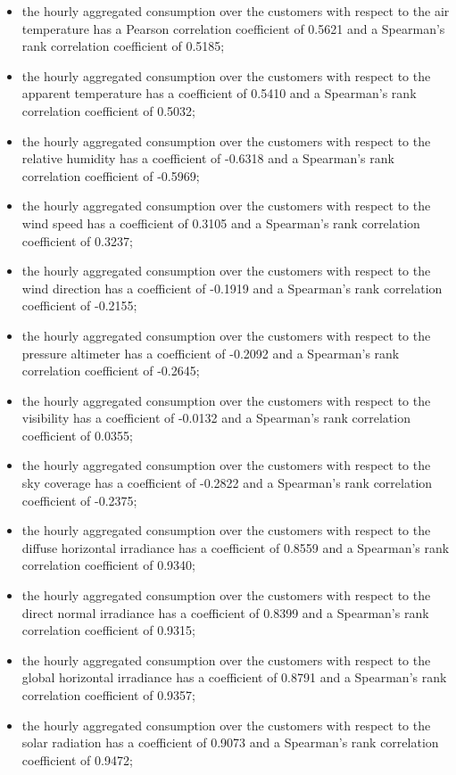 \begin{itemize}
  \item the hourly aggregated consumption over the customers with respect to the air temperature has a Pearson correlation coefficient of 0.5621 and a Spearman's rank correlation coefficient of 0.5185;
  \item the hourly aggregated consumption over the customers with respect to the apparent temperature has a coefficient of 0.5410 and a Spearman's rank correlation coefficient of 0.5032;
  \item the hourly aggregated consumption over the customers with respect to the relative humidity has a coefficient of -0.6318 and a Spearman's rank correlation coefficient of -0.5969;
  \item the hourly aggregated consumption over the customers with respect to the wind speed has a coefficient of 0.3105 and a Spearman's rank correlation coefficient of 0.3237;
  \item the hourly aggregated consumption over the customers with respect to the wind direction has a coefficient of -0.1919 and a Spearman's rank correlation coefficient of -0.2155;
  \item the hourly aggregated consumption over the customers with respect to the pressure altimeter has a coefficient of -0.2092 and a Spearman's rank correlation coefficient of -0.2645;
  \item the hourly aggregated consumption over the customers with respect to the visibility has a coefficient of -0.0132 and a Spearman's rank correlation coefficient of 0.0355;
  \item the hourly aggregated consumption over the customers with respect to the sky coverage has a coefficient of -0.2822 and a Spearman's rank correlation coefficient of -0.2375;
  \item the hourly aggregated consumption over the customers with respect to the diffuse horizontal irradiance has a coefficient of 0.8559 and a Spearman's rank correlation coefficient of 0.9340;
  \item the hourly aggregated consumption over the customers with respect to the direct normal irradiance has a coefficient of 0.8399 and a Spearman's rank correlation coefficient of 0.9315;
  \item the hourly aggregated consumption over the customers with respect to the global horizontal irradiance has a coefficient of 0.8791 and a Spearman's rank correlation coefficient of 0.9357;
  \item the hourly aggregated consumption over the customers with respect to the solar radiation has a coefficient of 0.9073 and a Spearman's rank correlation coefficient of 0.9472;

\end{itemize}
